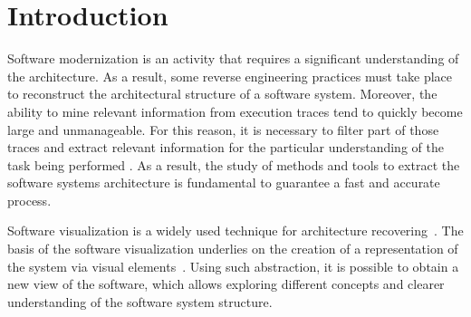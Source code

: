 \section{Introduction}


Software modernization is an activity that requires a significant understanding of the architecture.  As a result, some reverse engineering practices must take place to reconstruct the architectural structure of a software system. Moreover, the ability to mine relevant information from execution traces tend to quickly become large and unmanageable. For this reason, it is necessary to filter part of those traces and extract relevant information for the particular understanding of the task being performed \cite{canfora_achievements_2011}. As a result, the study of methods and tools to extract the software systems architecture is fundamental to guarantee a fast and accurate process. 

Software visualization is a widely used technique for architecture recovering~\cite{ghanam_survey_2008, teyseyre_overview_2009, lanza_codecrawler-lessons_2003, Feijs_loe}.  The basis of the software visualization underlies on the creation of a representation of the system via visual elements~\cite{teyseyre_overview_2009}. Using such abstraction, it is possible to obtain a new view of the software, which allows exploring different concepts and clearer understanding of the software system structure.

